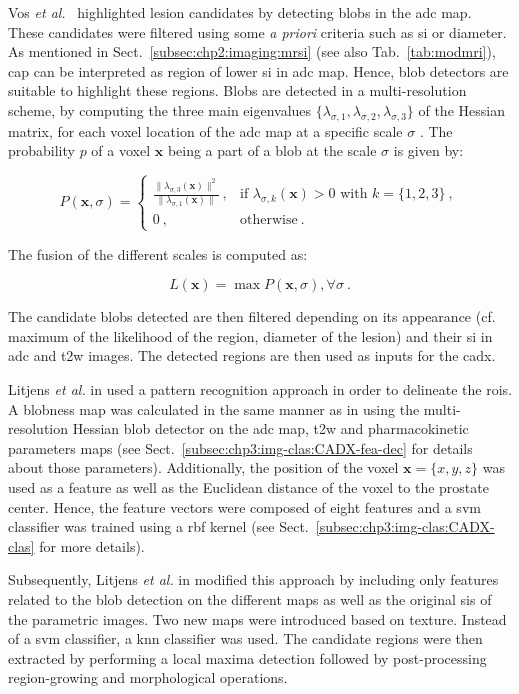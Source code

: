 Vos \textit{et al.}~\cite{Vos2012} highlighted lesion candidates by detecting blobs in the \ac{adc} map.
These candidates were filtered using some \textit{a priori} criteria such as \ac{si} or diameter.
As mentioned in Sect.~\ref{subsec:chp2:imaging:mrsi} (see also Tab.~\ref{tab:modmri}), \ac{cap} can be interpreted as region of lower \ac{si} in \ac{adc} map.
Hence, blob detectors are suitable to highlight these regions. 
Blobs are detected in a multi-resolution scheme, by computing the three main eigenvalues $\{ \lambda_{\sigma,1},\lambda_{\sigma,2},\lambda_{\sigma,3} \}$ of the Hessian matrix, for each voxel location of the \ac{adc} map at a specific scale $\sigma$ \cite{Li2003}.
The probability $p$ of a voxel $\mathbf{x}$ being a part of a blob at the scale $\sigma$ is given by:

\begin{equation}
P(\mathbf{x},\sigma) = \begin{cases}
	\frac{\| \lambda_{\sigma,3}(\mathbf{x}) \|^{2}}{\| \lambda_{\sigma,1} (\mathbf{x}) \|} \ , & \text{if } \lambda_{\sigma,k}(\mathbf{x}) > 0 \text{ with } k = \{1,2,3\} \  , \\
	0 \ , & \text{otherwise} \ .
\end{cases}
\label{eq:blobdet}
\end{equation}

\noindent The fusion of the different scales is computed as:

\begin{equation}
	L(\mathbf{x}) = \max P(\mathbf{x},\sigma) , \forall \sigma \ .
	\label{eq:fusionBlob}
\end{equation}

The candidate blobs detected are then filtered depending on its appearance (cf. maximum of the likelihood of the region, diameter of the lesion) and their \ac{si} in \ac{adc} and \ac{t2w} images.
The detected regions are then used as inputs for the \ac{cadx}.

Litjens \textit{et al.} in \cite{Litjens2011} used a pattern recognition approach in order to delineate the \acp{roi}.
A blobness map was calculated in the same manner as in \cite{Vos2010} using the multi-resolution Hessian blob detector on the \ac{adc} map, \ac{t2w} and pharmacokinetic parameters maps (see Sect.~\ref{subsec:chp3:img-clas:CADX-fea-dec} for details about those parameters).
Additionally, the position of the voxel $\mathbf{x}=\{x,y,z\}$ was used as a feature as well as the Euclidean distance of the voxel to the prostate center.
Hence, the feature vectors were composed of eight features and a \ac{svm} classifier was trained using a \ac{rbf} kernel (see Sect.~\ref{subsec:chp3:img-clas:CADX-clas} for more details).

Subsequently, Litjens \textit{et al.} in \cite{Litjens2012} modified this approach by including only features related to the blob detection on the different maps as well as the original \acp{si} of the parametric images.
Two new maps were introduced based on texture.
Instead of a \ac{svm} classifier, a \ac{knn} classifier was used.
The candidate regions were then extracted by performing a local maxima detection followed by post-processing region-growing and morphological operations. 
